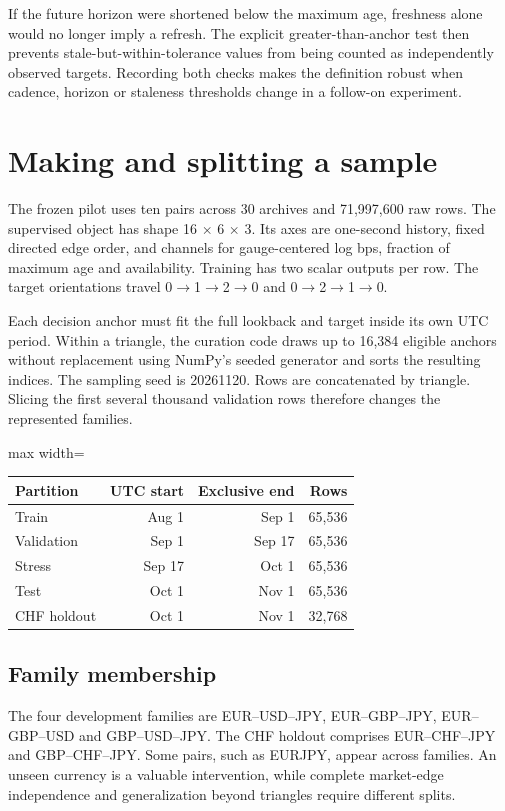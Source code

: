 \documentclass[11pt,oneside,openany]{book}
\begin{document}
If the future horizon were shortened below the maximum age, freshness alone would no longer imply a refresh. The explicit greater-than-anchor test then prevents stale-but-within-tolerance values from being counted as independently observed targets. Recording both checks makes the definition robust when cadence, horizon or staleness thresholds change in a follow-on experiment.

\chapter{Making and splitting a sample}
The frozen pilot uses ten pairs across 30 archives and 71,997,600 raw rows. The supervised object has shape 16 \ensuremath{\times} 6 \ensuremath{\times} 3. Its axes are one-second history, fixed directed edge order, and channels for gauge-centered log bps, fraction of maximum age and availability. Training has two scalar outputs per row. The target orientations travel 0\ensuremath{\to}1\ensuremath{\to}2\ensuremath{\to}0 and 0\ensuremath{\to}2\ensuremath{\to}1\ensuremath{\to}0.

Each decision anchor must fit the full lookback and target inside its own UTC period. Within a triangle, the curation code draws up to 16,384 eligible anchors without replacement using NumPy's seeded generator and sorts the resulting indices. The sampling seed is 20261120. Rows are concatenated by triangle. Slicing the first several thousand validation rows therefore changes the represented families.

\begin{center}\footnotesize\sffamily\setlength{\tabcolsep}{3.5pt}\renewcommand{\arraystretch}{1.2}
\begin{adjustbox}{max width=\linewidth}\begin{tabular}{@{}lrrr@{}}\toprule
Partition & UTC start & Exclusive end & Rows \\ \midrule
Train & Aug 1 & Sep 1 & 65,536 \\
Validation & Sep 1 & Sep 17 & 65,536 \\
Stress & Sep 17 & Oct 1 & 65,536 \\
Test & Oct 1 & Nov 1 & 65,536 \\
CHF holdout & Oct 1 & Nov 1 & 32,768 \\
\bottomrule\end{tabular}\end{adjustbox}\end{center}
\section*{Family membership}
The four development families are EUR–USD–JPY, EUR–GBP–JPY, EUR–GBP–USD and GBP–USD–JPY. The CHF holdout comprises EUR–CHF–JPY and GBP–CHF–JPY. Some pairs, such as EURJPY, appear across families. An unseen currency is a valuable intervention, while complete market-edge independence and generalization beyond triangles require different splits.
\end{document}
